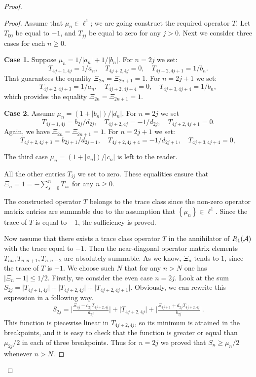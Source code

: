 \begin{proof}
\begin{proof}
        Assume that $\mu_n \in \ell^1$; we are going construct the required operator $T$.
        Let $T_{00}$ be equal to $-1$, and $T_{jj}$ be equal to zero for any $j > 0$.
        Next we consider three cases for each $n \geq 0$.

        \noindent\textbf{Case 1.}
        Suppose $\mu_n = 1/|a_n| + 1/|b_n|$.
        For $n=2j$ we set:
        \[
          T_{4j+1,4j}=1/a_n, \quad T_{4j+2,4j} = 0, \quad T_{4j+2,4j+1}=1/b_n.
        \]
        That guarantees the equality $\Xi_{2n} = \Xi_{2n+1} = 1$.
        For $n=2j+1$ we set:
        \[
          T_{4j+2,4j+3}=1/a_n, \quad T_{4j+2,4j+4} = 0, \quad T_{4j+3,4j+4}=1/b_n,
        \]
        which provides the equality $\Xi_{2n} = \Xi_{2n+1} = 1$.

        \noindent\textbf{Case 2.}
        Assume $\mu_n = (1 + |b_n|)/|d_n|$.
        For $n=2j$ we set
        \[
          T_{4j+1,4j} = b_{2j}/d_{2j}, \quad T_{4j+2,4j} = -1/d_{2j}, \quad T_{4j+2,4j+1} = 0.
        \]
        Again, we have $\Xi_{2n} = \Xi_{2n+1} = 1$.
        For $n = 2j + 1$ we set:
        \[ 
          T_{4j+2,4j+3}=b_{2j+1}/d_{2j+1},  \quad T_{4j+2,4j+4} = -1/d_{2j+1}, \quad T_{4j+3,4j+4}=0,
        \]

        The third case $\mu_n = (1 + |a_n|)/|c_n|$ is left to the reader.
        \medskip

        All the other entries $T_{ij}$ we set to zero.
        These equalities ensure that $\Xi_n = 1 = -\sum_{s=0}^n T_{ss}$ for any $n \geq 0$.

        The constructed operator $T$ belongs to the trace class since the non-zero operator matrix entries are summable
          due to the assumption that $\left\{\mu_n\right\} \in \ell^1$.
        Since the trace of $T$ is equal to $-1$, the sufficiency is proved.

        Now assume that there exists a trace class operator $T$ in the annihilator of $R_1(\cal{A})$ with the trace equal to $-1$.
        Then the near-diagonal operator matrix elements $T_{nn}, T_{n, n+1}, T_{n, n+2}$ are absolutely summable.
        As we know, $\Xi_n$ tends to $1$, since the trace of $T$ is $-1$.
        We choose such $N$ that for any $n > N$ one has $\lvert \Xi_n - 1 \rvert \leq 1/2$.
        Firstly, we consider the even case $n = 2j$.
        Look at the sum $S_{2j} = \lvert T_{4j+1, 4j} \rvert + \lvert T_{4j+2,4j} \rvert + \lvert T_{4j+2,4j+1}\rvert$.
        Obviously, we can rewrite this expression in a following way.
        \begin{align*}
          S_{2j} = \Big\lvert \frac{\Xi_{4j} - c_{2j} T_{4j+2, 4j}}{a_{2j}} \Big\rvert +
                   \Big\lvert T_{4j+2, 4j} \Big\rvert +
                   \Big\lvert \frac{\Xi_{4j+1} + d_{2j} T_{4j+2, 4j}}{b_{2j}} \Big\rvert.
        \end{align*}
        This function is piecewise linear in $T_{4j+2, 4j}$, so its minimum is attained in the breakpoints, and
          it is easy to check that the function is greater or equal than $\mu_{2j}/2$ in each of three breakpoints.
        Thus for $n=2j$ we proved that $S_n \geq \mu_n/2$ whenever $n > N$.


\end{proof}
\end{proof}
